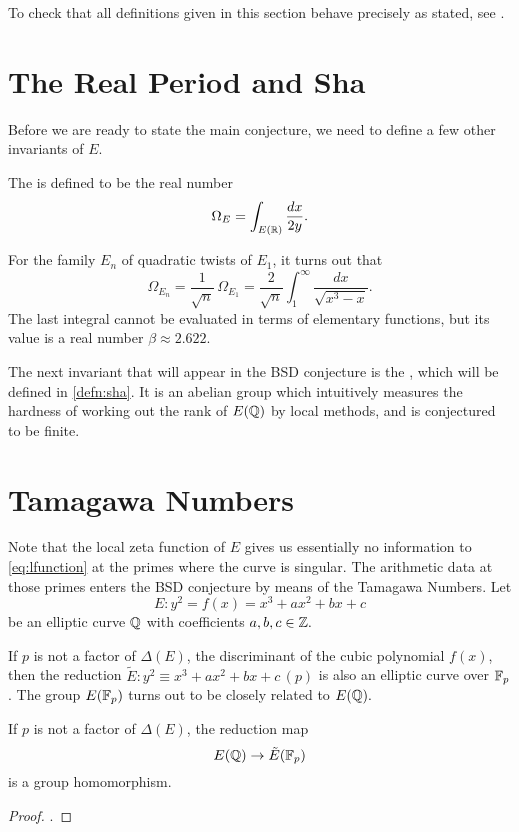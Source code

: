 \documentclass[12pt, a4paper]{report}
\begin{document}
\begin{remark}
  To check that all definitions given in this section behave precisely as
  stated, see \cite[Chapter 13.7-8, pages 123-127]{Granville}.
\end{remark}
  

\section{The Real Period and Sha}

Before we are ready to state the main conjecture, we need to define a few
other invariants of $E$. 

\begin{defn} \label{proof:real_period}
  The  is defined to be the real number
  \[\Omega_E = \int_{E({\mathbb R})} \frac{dx}{2y}.\]

  For the family $E_n$ of quadratic twists of $E_1$, it turns out that
  \[\Omega_{E_n} = \frac{1}{\sqrt{n}} \, \Omega_{E_1} = \frac{2}{\sqrt{n}}
    \int_1^\infty \frac{dx}{\sqrt{x^3-x}}.\]
  The last integral cannot be evaluated in terms of elementary functions, but
  its value is a real number $\beta \approx 2.622$.
\end{defn}

The next invariant that will appear in the BSD conjecture is the
, which will
be defined in \autoref{defn:sha}. It is an abelian group which intuitively measures
the hardness of working out the rank of $E({\mathbb Q})$ by local methods, and is conjectured
to be finite.

\section{Tamagawa Numbers}

Note that the local zeta function of $E$ gives us essentially no
information to \autoref{eq:lfunction} at the primes where the curve is singular.
The arithmetic data at those
primes enters the BSD conjecture by means of the Tamagawa
Numbers. 
Let
$$ E : y^2 = f(x) = x^3 + ax^2 + bx + c $$
be an elliptic curve ${\mathbb Q}$ with coefficients $a,b,c \in {\mathbb Z}.$

If $p$ is not a factor of $\Delta(E)$, the discriminant of the cubic polynomial
$f(x)$,
then the reduction
$\tilde{E} : y^2 \equiv x^3 +ax^2 + b x + c \, (p)$ is
also an elliptic curve over $\mathbb{F}_p$. The group $E(\mathbb{F}_p)$ turns out to be
closely related to $E({\mathbb Q}).$

\begin{prop}
  If $p $ is not a factor of $ \Delta(E)$, the reduction map
  $$E({\mathbb Q}) \rightarrow \tilde{E}(\mathbb{F}_p)$$ is a group homomorphism.
\end{prop}
\begin{proof}
  \cite[See][Chapter IV, pages 121-123]{rational}.
\end{proof}
\end{document}
